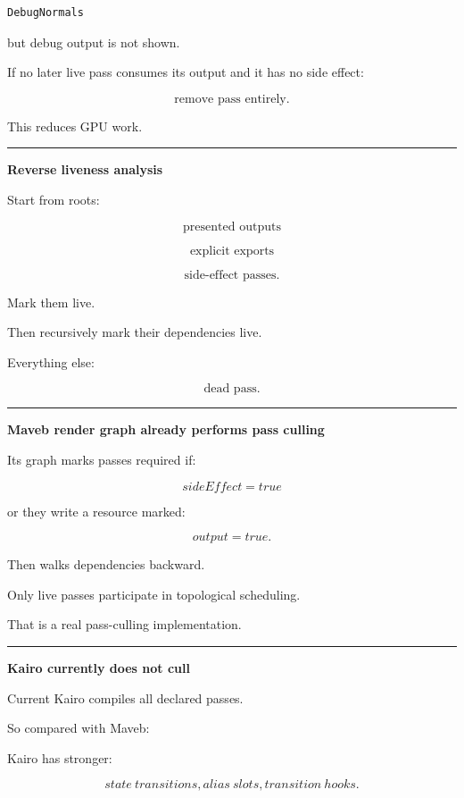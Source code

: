 \begin{verbatim}
DebugNormals
\end{verbatim}

but debug output is not shown.

If no later live pass consumes its output and it has no side effect:

\[
\boxed{
\text{remove pass entirely}.
}
\]

This reduces GPU work.

\begin{center}\rule{0.5\linewidth}{0.5pt}\end{center}

\textbf{Reverse liveness analysis}

Start from roots:

\[
\text{presented outputs}
\]

\[
\text{explicit exports}
\]

\[
\text{side-effect passes}.
\]

Mark them live.

Then recursively mark their dependencies live.

Everything else:

\[
\boxed{\text{dead pass}.}
\]

\begin{center}\rule{0.5\linewidth}{0.5pt}\end{center}

\textbf{Maveb render graph already performs pass culling}

Its graph marks passes required if:

\[
sideEffect=true
\]

or they write a resource marked:

\[
output=true.
\]

Then walks dependencies backward.

Only live passes participate in topological scheduling.

That is a real pass-culling implementation.

\begin{center}\rule{0.5\linewidth}{0.5pt}\end{center}

\textbf{Kairo currently does not cull}

Current Kairo compiles all declared passes.

So compared with Maveb:

Kairo has stronger:

\[
state\ transitions,
alias\ slots,
transition\ hooks.
\]

